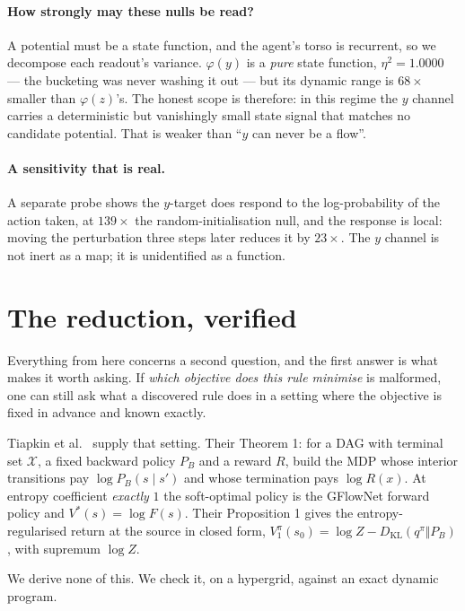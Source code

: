 \documentclass[11pt]{article}
\theoremstyle{remark}
\newcommand{\KL}{D_{\mathrm{KL}}}
\begin{document}
\paragraph{How strongly may these nulls be read?} A potential must be a state
function, and the agent's torso is recurrent, so we decompose each readout's
variance. $\varphi(y)$ is a \emph{pure} state function, $\eta^2 = 1.0000$ --- the
bucketing was never washing it out --- but its dynamic range is $68\times$
smaller than $\varphi(z)$'s. The honest scope is therefore: in this regime the
$y$ channel carries a deterministic but vanishingly small state signal that
matches no candidate potential. That is weaker than ``$y$ can never be a flow''.

\paragraph{A sensitivity that is real.} A separate probe shows the $y$-target does
respond to the log-probability of the action taken, at $139\times$ the
random-initialisation null, and the response is local: moving the perturbation
three steps later reduces it by $23\times$. The $y$ channel is not inert as a map;
it is unidentified as a function.

\section{The reduction, verified}\label{sec:reduction}

Everything from here concerns a second question, and the first answer is what
makes it worth asking. If \emph{which objective does this rule minimise} is
malformed, one can still ask what a discovered rule does in a setting where the
objective is fixed in advance and known exactly.

Tiapkin et al.\ \cite{tiapkin2024} supply that setting. Their Theorem 1: for a
DAG with terminal set $\mathcal X$, a fixed backward policy $P_B$ and a reward
$R$, build the MDP whose interior transitions pay $\log P_B(s \mid s')$ and whose
termination pays $\log R(x)$. At entropy coefficient \emph{exactly} $1$ the
soft-optimal policy is the GFlowNet forward policy and $V^*(s) = \log F(s)$.
Their Proposition 1 gives the entropy-regularised return at the source in closed
form, $V_1^\pi(s_0) = \log Z - \KL(q^\pi \Vert P_B)$, with supremum $\log Z$.

We derive none of this. We check it, on a hypergrid, against an exact dynamic
program.
\end{document}
